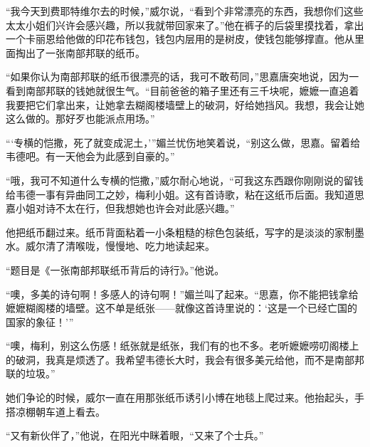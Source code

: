 \par “我今天到费耶特维尔去的时候，”威尔说，“看到个非常漂亮的东西，我想你们这些太太小姐们兴许会感兴趣，所以我就带回家来了。”他在裤子的后袋里摸找着，拿出一个卡丽恩给他做的印花布钱包，钱包内层用的是树皮，使钱包能够撑直。他从里面掏出了一张南部邦联的纸币。
\par “如果你认为南部邦联的纸币很漂亮的话，我可不敢苟同，”思嘉唐突地说，因为一看到南部邦联的钱她就很生气。“目前爸爸的箱子里还有三千块呢，嬷嬷一直追着我要把它们拿出来，让她拿去糊阁楼墙壁上的破洞，好给她挡风。我想，我会让她这么做的。那好歹也能派点用场。”
\par “‘专横的恺撒，死了就变成泥土，'”媚兰忧伤地笑着说，“别这么做，思嘉。留着给韦德吧。有一天他会为此感到自豪的。”
\par “哦，我可不知道什么专横的恺撒，”威尔耐心地说，“可我这东西跟你刚刚说的留钱给韦德一事有异曲同工之妙，梅利小姐。这有首诗歌，粘在这纸币后面。我知道思嘉小姐对诗不太在行，但我想她也许会对此感兴趣。”
\par 他把纸币翻过来。纸币背面粘着一小条粗糙的棕色包装纸，写字的是淡淡的家制墨水。威尔清了清喉咙，慢慢地、吃力地读起来。
\par “题目是《一张南部邦联纸币背后的诗行》。”他说。
\par “噢，多美的诗句啊！多感人的诗句啊！”媚兰叫了起来。“思嘉，你不能把钱拿给嬷嬷糊阁楼的墙壁。这不单是纸张——就像这首诗里说的：‘这是一个已经亡国的国家的象征！'”
\par “噢，梅利，别这么伤感！纸张就是纸张，我们有的也不多。老听嬷嬷唠叨阁楼上的破洞，我真是烦透了。我希望韦德长大时，我会有很多美元给他，而不是南部邦联的垃圾。”
\par 她们争论的时候，威尔一直在用那张纸币诱引小博在地毯上爬过来。他抬起头，手搭凉棚朝车道上看去。
\par “又有新伙伴了，”他说，在阳光中眯着眼，“又来了个士兵。”
